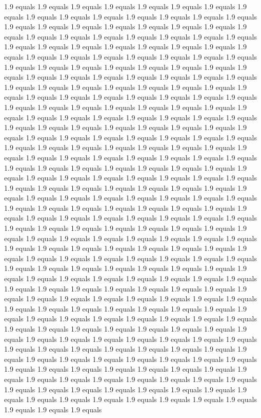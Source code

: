 1.9 equals 1.9 equals 1.9 equals 1.9 equals 1.9 equals 1.9 equals 1.9 equals 1.9 equals 1.9 equals 1.9 equals 1.9 equals 1.9 equals 1.9 equals 1.9 equals 1.9 equals 1.9 equals 1.9 equals 1.9 equals 1.9 equals 1.9 equals 1.9 equals 1.9 equals 1.9 equals 1.9 equals 1.9 equals 1.9 equals 1.9 equals 1.9 equals 1.9 equals 1.9 equals 1.9 equals 1.9 equals 1.9 equals 1.9 equals 1.9 equals 1.9 equals 1.9 equals 1.9 equals 1.9 equals 1.9 equals 1.9 equals 1.9 equals 1.9 equals 1.9 equals 1.9 equals 1.9 equals 1.9 equals 1.9 equals 1.9 equals 1.9 equals 1.9 equals 1.9 equals 1.9 equals 1.9 equals 1.9 equals 1.9 equals 1.9 equals 1.9 equals 1.9 equals 1.9 equals 1.9 equals 1.9 equals 1.9 equals 1.9 equals 1.9 equals 1.9 equals 1.9 equals 1.9 equals 1.9 equals 1.9 equals 1.9 equals 1.9 equals 1.9 equals 1.9 equals 1.9 equals 1.9 equals 1.9 equals 1.9 equals 1.9 equals 1.9 equals 1.9 equals 1.9 equals 1.9 equals 1.9 equals 1.9 equals 1.9 equals 1.9 equals 1.9 equals 1.9 equals 1.9 equals 1.9 equals 1.9 equals 1.9 equals 1.9 equals 1.9 equals 1.9 equals 1.9 equals 1.9 equals 1.9 equals 1.9 equals 1.9 equals 1.9 equals 1.9 equals 1.9 equals 1.9 equals 1.9 equals 1.9 equals 1.9 equals 1.9 equals 1.9 equals 1.9 equals 1.9 equals 1.9 equals 1.9 equals 1.9 equals 1.9 equals 1.9 equals 1.9 equals 1.9 equals 1.9 equals 1.9 equals 1.9 equals 1.9 equals 1.9 equals 1.9 equals 1.9 equals 1.9 equals 1.9 equals 1.9 equals 1.9 equals 1.9 equals 1.9 equals 1.9 equals 1.9 equals 1.9 equals 1.9 equals 1.9 equals 1.9 equals 1.9 equals 1.9 equals 1.9 equals 1.9 equals 1.9 equals 1.9 equals 1.9 equals 1.9 equals 1.9 equals 1.9 equals 1.9 equals 1.9 equals 1.9 equals 1.9 equals 1.9 equals 1.9 equals 1.9 equals 1.9 equals 1.9 equals 1.9 equals 1.9 equals 1.9 equals 1.9 equals 1.9 equals 1.9 equals 1.9 equals 1.9 equals 1.9 equals 1.9 equals 1.9 equals 1.9 equals 1.9 equals 1.9 equals 1.9 equals 1.9 equals 1.9 equals 1.9 equals 1.9 equals 1.9 equals 1.9 equals 1.9 equals 1.9 equals 1.9 equals 1.9 equals 1.9 equals 1.9 equals 1.9 equals 1.9 equals 1.9 equals 1.9 equals 1.9 equals 1.9 equals 1.9 equals 1.9 equals 1.9 equals 1.9 equals 1.9 equals 1.9 equals 1.9 equals 1.9 equals 1.9 equals 1.9 equals 1.9 equals 1.9 equals 1.9 equals 1.9 equals 1.9 equals 1.9 equals 1.9 equals 1.9 equals 1.9 equals 1.9 equals 1.9 equals 1.9 equals 1.9 equals 1.9 equals 1.9 equals 1.9 equals 1.9 equals 1.9 equals 1.9 equals 1.9 equals 1.9 equals 1.9 equals 1.9 equals 1.9 equals 1.9 equals 1.9 equals 1.9 equals 1.9 equals 1.9 equals 1.9 equals 1.9 equals 1.9 equals 1.9 equals 1.9 equals 1.9 equals 1.9 equals 1.9 equals 1.9 equals 1.9 equals 1.9 equals 1.9 equals 1.9 equals 1.9 equals 1.9 equals 1.9 equals 1.9 equals 1.9 equals 1.9 equals 1.9 equals 1.9 equals 1.9 equals 1.9 equals 1.9 equals 1.9 equals 1.9 equals 1.9 equals 1.9 equals 1.9 equals 1.9 equals 1.9 equals 1.9 equals 1.9 equals 1.9 equals 1.9 equals 1.9 equals 1.9 equals 1.9 equals 1.9 equals 1.9 equals 1.9 equals 1.9 equals 1.9 equals 1.9 equals 1.9 equals 1.9 equals 1.9 equals 1.9 equals 1.9 equals 1.9 equals 1.9 equals 1.9 equals 1.9 equals 1.9 equals 1.9 equals 1.9 equals 1.9 equals 1.9 equals 1.9 equals 1.9 equals 1.9 equals 1.9 equals 1.9 equals 1.9 equals 1.9 equals 1.9 equals 1.9 equals 1.9 equals 1.9 equals 1.9 equals 1.9 equals 1.9 equals 1.9 equals 1.9 equals 